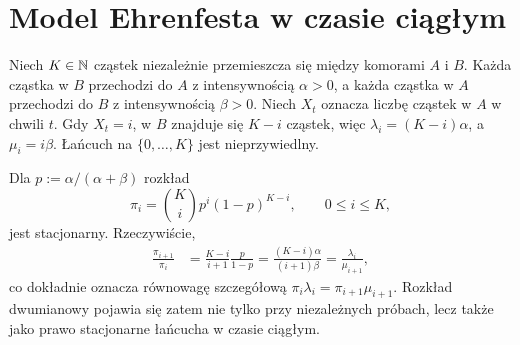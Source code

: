 \section{Model Ehrenfesta w czasie ciągłym}
\begin{przyklad}
Niech $K\in\mathbb{N}$ cząstek niezależnie przemieszcza się
między komorami $A$ i $B$. Każda cząstka w $B$ przechodzi
do $A$ z intensywnością $\alpha>0$, a każda cząstka w $A$
przechodzi do $B$ z intensywnością $\beta>0$.
Niech $X_t$ oznacza liczbę cząstek w $A$ w chwili $t$.
Gdy $X_t=i$, w $B$ znajduje się $K-i$ cząstek, więc
$\lambda_i=(K-i)\alpha$, a $\mu_i=i\beta$.
Łańcuch na $\{0,\ldots,K\}$ jest nieprzywiedlny.

Dla $p:=\alpha/(\alpha+\beta)$ rozkład
\[
\pi_i=\binom Ki p^i(1-p)^{K-i},\qquad 0\le i\le K,
\]
jest stacjonarny. Rzeczywiście,
\begin{align*}
\frac{\pi_{i+1}}{\pi_i}
&=\frac{K-i}{i+1}\frac{p}{1-p}
=\frac{(K-i)\alpha}{(i+1)\beta}
=\frac{\lambda_i}{\mu_{i+1}},
\end{align*}
co dokładnie oznacza równowagę szczegółową
$\pi_i\lambda_i=\pi_{i+1}\mu_{i+1}$.
Rozkład dwumianowy pojawia się zatem nie tylko
przy niezależnych próbach, lecz także jako prawo
stacjonarne łańcucha w czasie ciągłym.
\end{przyklad}

